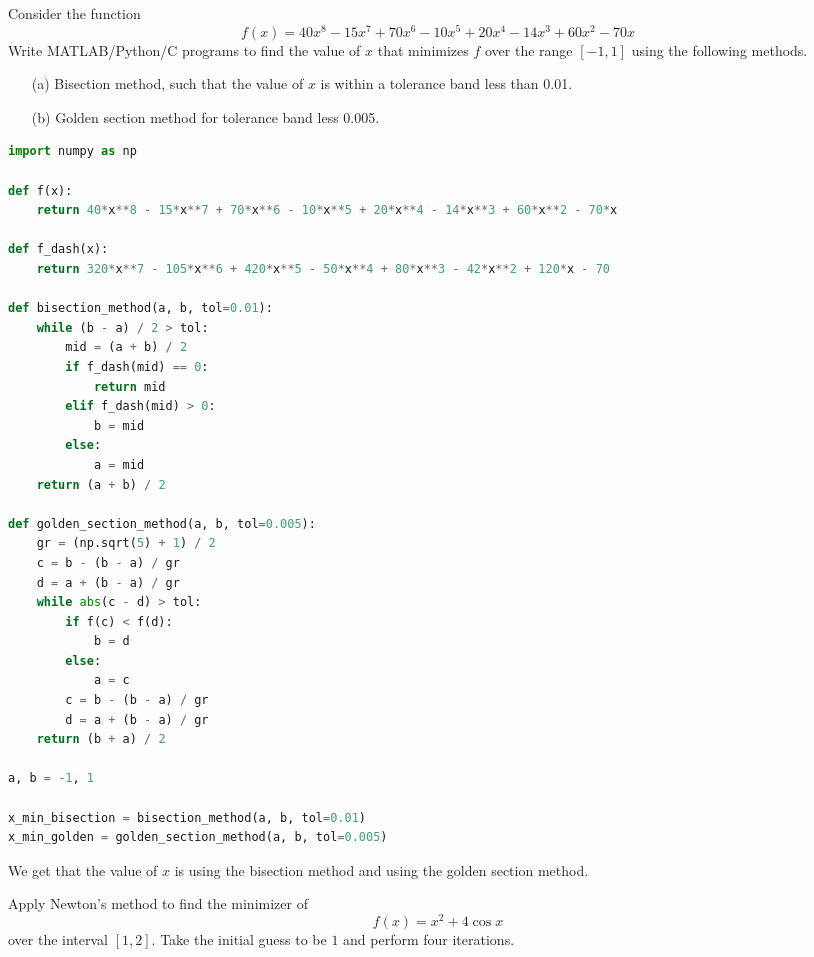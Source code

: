 \documentclass{article}
\begin{document}
\thispagestyle{empty}

\titleBC

\begin{question*}[1]
	Consider the function 
	\[
		f(x) = 40x^8 - 15x^7 + 70x^6 - 10x^5 + 20x^4 - 14x^3 + 60x^2 - 70x
	\]
	Write MATLAB/Python/C programs to find the value of \( x \) that minimizes \( f \) over the range \([-1,1]\) using the following methods.

	\begin{itemize}
	    \item[(a)] Bisection method, such that the value of \( x \) is within a tolerance band less than 0.01.
	    \item[(b)] Golden section method for tolerance band less 0.005.
	\end{itemize}
\end{question*}

\begin{lstlisting}[language=python]
import numpy as np

def f(x):
    return 40*x**8 - 15*x**7 + 70*x**6 - 10*x**5 + 20*x**4 - 14*x**3 + 60*x**2 - 70*x

def f_dash(x):
    return 320*x**7 - 105*x**6 + 420*x**5 - 50*x**4 + 80*x**3 - 42*x**2 + 120*x - 70

def bisection_method(a, b, tol=0.01):
    while (b - a) / 2 > tol:
        mid = (a + b) / 2
        if f_dash(mid) == 0:
            return mid
        elif f_dash(mid) > 0:
            b = mid
        else:
            a = mid
    return (a + b) / 2

def golden_section_method(a, b, tol=0.005):
    gr = (np.sqrt(5) + 1) / 2
    c = b - (b - a) / gr
    d = a + (b - a) / gr
    while abs(c - d) > tol:
        if f(c) < f(d):
            b = d
        else:
            a = c
        c = b - (b - a) / gr
        d = a + (b - a) / gr
    return (b + a) / 2

a, b = -1, 1

x_min_bisection = bisection_method(a, b, tol=0.01)
x_min_golden = golden_section_method(a, b, tol=0.005)
\end{lstlisting}

We get that the value of $x$ is  using the bisection method and  using the golden section method.

\clearpage

\begin{question*}[2]
    Apply Newton's method to find the minimizer of 
    \[
        f(x) = x^2 + 4 \cos x
    \]
    over the interval $[1, 2]$. Take the initial guess to be $1$ and perform four iterations.
\end{question*}
\end{document}
